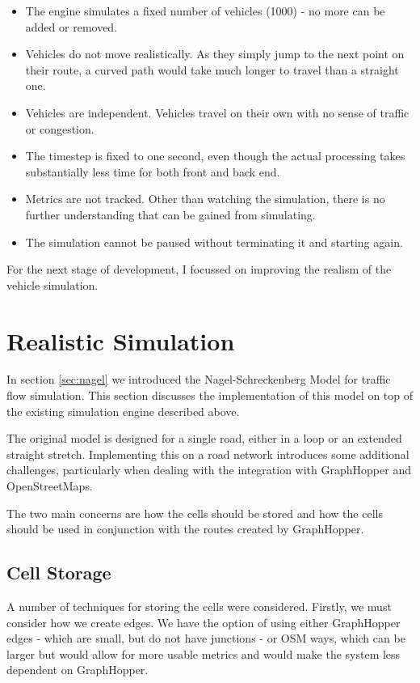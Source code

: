 \documentclass[ %
                    author={Alexander Hill},
                supervisor={Dr. Benjamin Sach},
                    degree={MEng},
                     title={MARMOSET},
                  subtitle={Multi-Agent Route Management using Online Simulation for Efficient Transportation},
                      type={research},
                      year={2016} ]{dissertation}
\begin{document}
\begin{itemize}
    \item The engine simulates a fixed number of vehicles (1000) - no more can
        be added or removed.
    \item Vehicles do not move realistically. As they simply jump to the next
        point on their route, a curved path would take much longer to travel
        than a straight one.
    \item Vehicles are independent. Vehicles travel on their own with no sense
        of traffic or congestion.
    \item The timestep is fixed to one second, even though the actual processing
        takes substantially less time for both front and back end.
    \item Metrics are not tracked. Other than watching the simulation, there is
        no further understanding that can be gained from simulating.
    \item The simulation cannot be paused without terminating it and starting
        again.
\end{itemize}

For the next stage of development, I focussed on improving the realism of the
vehicle simulation.

\section{Realistic Simulation}

In section \ref{sec:nagel} we introduced the Nagel-Schreckenberg Model for
traffic flow simulation. This section discusses the implementation of this model
on top of the existing simulation engine described above.

The original model is designed for a single road, either in a loop or an
extended straight stretch. Implementing this on a road network introduces some
additional challenges, particularly when dealing with the integration with
GraphHopper and OpenStreetMaps.

The two main concerns are how the cells should be stored and how the cells
should be used in conjunction with the routes created by GraphHopper.

\subsection{Cell Storage}

A number of techniques for storing the cells were considered. Firstly, we must
consider how we create edges. We have the option of using either GraphHopper
edges - which are small, but do not have junctions - or OSM ways, which can be
larger but would allow for more usable metrics and would make the system less
dependent on GraphHopper.
\end{document}
